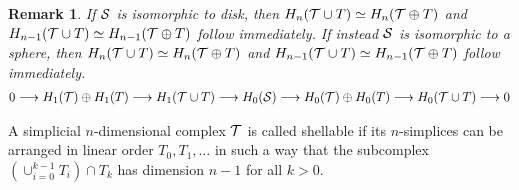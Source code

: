 \documentclass[a4paper]{article}
\newtheorem{remark}{Remark}
\begin{document}
\begin{remark}
    If ${\mathcal S}$ is isomorphic to disk,
    then $H_{n}({\mathcal T} \cup T) \simeq H_{n}({\mathcal T} \oplus T)$ and $H_{n-1}({\mathcal T} \cup T) \simeq H_{n-1}({\mathcal T} \oplus T)$ follow immediately.
    If instead ${\mathcal S}$ is isomorphic to a sphere, 
    then $H_{n}({\mathcal T} \cup T) \simeq H_{n}({\mathcal T} \oplus T)$ and $H_{n-1}({\mathcal T} \cup T) \simeq H_{n-1}({\mathcal T} \oplus T)$ follow immediately.
    \begin{align*}
        \begin{CD}
            0 \longrightarrow H_{1}(\calT) \oplus H_{1}(T) \longrightarrow H_{1}(\calT \cup T) \longrightarrow H_{0}(\calS) \longrightarrow H_{0}(\calT) \oplus H_{0}(T) \longrightarrow H_{0}(\calT \cup T) \longrightarrow 0 
        \end{CD}
    \end{align*}
\end{remark}

A simplicial $n$-dimensional complex ${\mathcal T}$ is called shellable if its $n$-simplices can be arranged in linear order $T_0, T_1, \dots$ in such a way that the subcomplex $( \cup_{i=0}^{k-1} T_i ) \cap T_k$ has dimension $n-1$ for all $k > 0$.



\end{document}
